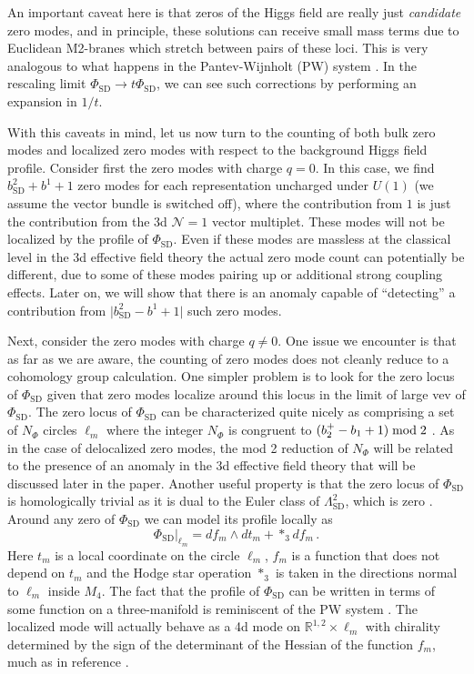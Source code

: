 \documentclass[12pt]{article}%
\numberwithin{equation}{section}
\renewcommand{\(}{\left(}
\renewcommand{\)}{\right)}
\renewcommand{\[}{\left[}
\renewcommand{\]}{\right]}
\begin{document}
An important caveat here is that zeros of the Higgs field are really just \textit{candidate} zero modes, and in principle, these solutions can receive small mass terms due to Euclidean M2-branes which stretch between pairs of these loci. This is very analogous to what happens in the Pantev-Wijnholt (PW) system \cite{Pantev:2009de}. In the rescaling limit $\Phi_{\mathrm{SD}} \rightarrow t \Phi_{\mathrm{SD}}$, we can see such corrections by performing an expansion in $1 / t$.

With this caveats in mind, let us now turn to the counting of both bulk zero modes and localized zero modes with respect to the background Higgs field profile. Consider first the zero modes with charge $q = 0 $. In this case, we find $b^2_{\mathrm{SD}} + b^1 + 1$ zero modes for each representation uncharged under $U(1)$ (we assume the vector bundle is switched off), where the contribution from $1$ is just the contribution from the 3d $\mathcal{N} = 1$ vector multiplet. These modes will not be localized by the profile of $\Phi_{\mathrm{SD}}$. Even if these modes are massless at the classical level in the 3d effective field theory the actual zero mode count can potentially be different, due to some of these modes pairing up or additional strong coupling effects. Later on, we will show that there is an anomaly capable of ``detecting'' a contribution from $\vert b^2_{\mathrm{SD}} - b^1 + 1 \vert$ such zero modes.

Next, consider the zero modes with charge $q \neq 0$. One issue we encounter is that as far as we are aware,
the counting of zero modes does not cleanly reduce to a cohomology group calculation. One simpler problem is to look for the zero locus of $\Phi_{\mathrm{SD}}$ given that zero modes localize around this locus in the limit of large vev of $\Phi_{\mathrm{SD}}$. The zero locus of $\Phi_{\mathrm{SD}}$ can be characterized quite nicely as comprising a set of $N_{\Phi}$ circles $\ell_m$ where the integer $N_\Phi$ is congruent to $(b^+_2-b_1+1) \; \textnormal{mod} \; 2$ \cite{perutz2006zero}. As in the case of delocalized zero modes, the mod 2 reduction of $N_\Phi$ will be related to the presence of an anomaly in the 3d effective field theory that will be discussed later in the paper. Another useful property is that the zero locus of $\Phi_{\mathrm{SD}}$ is homologically trivial as it is dual to the Euler class of $\Lambda_{\mathrm{SD}}^2$, which is zero \cite{perutz2006zero}. Around any zero of $\Phi_{\mathrm{SD}}$ we can model its profile locally as
\begin{equation}\label{Spin(7)PW}
\Phi_{\mathrm{SD}}|_{\ell_m}=df_m\wedge dt_m+*_3 df_m\,.
\end{equation}
Here $t_m$ is a local coordinate on the circle $\ell_m$, $f_m$ is a function that does not depend on $t_m$ and the Hodge star operation $*_3$ is taken in the directions normal to $\ell_m$ inside $M_4$. The fact that the profile of $\Phi_{\mathrm{SD}}$ can be written in terms of some function on a three-manifold is reminiscent of the PW system \cite{Pantev:2009de}. The localized mode will actually behave as a 4d mode on $\mathbb R^{1,2} \times \ell_m$ with chirality determined by the sign of the determinant of the Hessian of the function $f_m$, much as in reference \cite{Pantev:2009de}.
\end{document}
